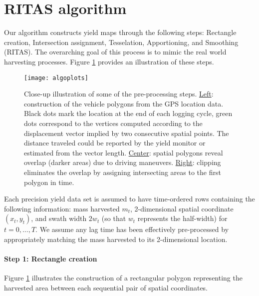 \section{RITAS algorithm}

Our algorithm constructs yield maps through the following steps:
Rectangle creation, Intersection assignment, Tesselation,
Apportioning, and Smoothing (RITAS). The overarching goal of this
process is to mimic the real world harvesting processes. Figure
\ref{fig:closeup} provides an illustration of these steps.

\begin{figure}[h!]  \centering
\texttt{[image: algoplots]}
    \caption{Close-up illustration of some of the pre-processing
steps. \underline{Left}: construction of the vehicle polygons from the
GPS location data. Black dots mark the location at the end of each
logging cycle, green dots correspond to the vertices computed
according to the displacement vector implied by two consecutive
spatial points. The distance traveled could be reported by the yield
monitor or estimated from the vector length. \underline{Center}:
spatial polygons reveal overlap (darker areas) due to driving
maneuvers. \underline{Right}: clipping eliminates the overlap by
assigning intersecting areas to the first polygon in time.}
    \label{fig:closeup}
\end{figure} 

Each precision yield data set is assumed to have time-ordered rows
containing the following information: mass harvested $m_t$,
2-dimensional spatial coordinate $(x_t,y_t)$, and swath width $2w_t$
(so that $w_t$ represents the half-width) for $t=0,\ldots,T$.  We
assume any lag time has been effectively pre-processed by
appropriately matching the mass harvested to its 2-dimensional
location.  

\paragraph*{Step 1: Rectangle creation}

Figure \ref{} illustrates the construction of a rectangular polygon
representing the harvested area between each sequential pair of
spatial coordinates.

